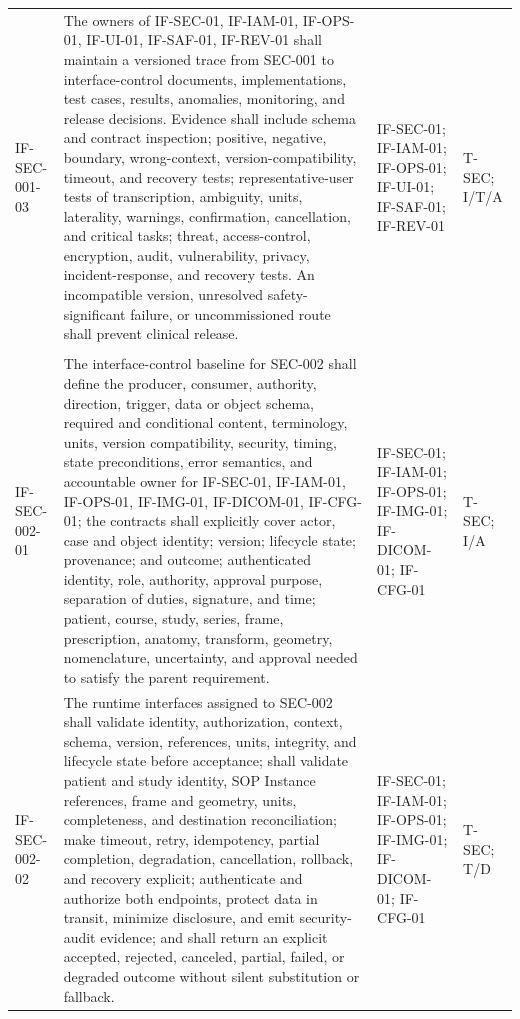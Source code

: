 \documentclass[11pt,letterpaper]{article}
\begin{document}
\begin{scriptsize}
\begin{longtable}{@{}L{0.14\textwidth}L{0.49\textwidth}L{0.19\textwidth}L{0.10\textwidth}@{}}
\addlinespace[2pt]
\mbox{IF-SEC-001-03} & The owners of IF-SEC-01, IF-IAM-01, IF-OPS-01, IF-UI-01, IF-SAF-01, IF-REV-01 shall maintain a versioned trace from SEC-001 to interface-control documents, implementations, test cases, results, anomalies, monitoring, and release decisions. Evidence shall include schema and contract inspection; positive, negative, boundary, wrong-context, version-compatibility, timeout, and recovery tests; representative-user tests of transcription, ambiguity, units, laterality, warnings, confirmation, cancellation, and critical tasks; threat, access-control, encryption, audit, vulnerability, privacy, incident-response, and recovery tests. An incompatible version, unresolved safety-significant failure, or uncommissioned route shall prevent clinical release. & IF-SEC-01; IF-IAM-01; IF-OPS-01; IF-UI-01; IF-SAF-01; IF-REV-01 & T-SEC; I\slash\allowbreak{}T\slash\allowbreak{}A \\
\addlinespace[2pt]
 \\
\addlinespace[2pt]
\mbox{IF-SEC-002-01} & The interface-control baseline for SEC-002 shall define the producer, consumer, authority, direction, trigger, data or object schema, required and conditional content, terminology, units, version compatibility, security, timing, state preconditions, error semantics, and accountable owner for IF-SEC-01, IF-IAM-01, IF-OPS-01, IF-IMG-01, IF-DICOM-01, IF-CFG-01; the contracts shall explicitly cover actor, case and object identity; version; lifecycle state; provenance; and outcome; authenticated identity, role, authority, approval purpose, separation of duties, signature, and time; patient, course, study, series, frame, prescription, anatomy, transform, geometry, nomenclature, uncertainty, and approval needed to satisfy the parent requirement. & IF-SEC-01; IF-IAM-01; IF-OPS-01; IF-IMG-01; IF-DICOM-01; IF-CFG-01 & T-SEC; I\slash\allowbreak{}A \\
\addlinespace[2pt]
\mbox{IF-SEC-002-02} & The runtime interfaces assigned to SEC-002 shall validate identity, authorization, context, schema, version, references, units, integrity, and lifecycle state before acceptance; shall validate patient and study identity, SOP Instance references, frame and geometry, units, completeness, and destination reconciliation; make timeout, retry, idempotency, partial completion, degradation, cancellation, rollback, and recovery explicit; authenticate and authorize both endpoints, protect data in transit, minimize disclosure, and emit security-audit evidence; and shall return an explicit accepted, rejected, canceled, partial, failed, or degraded outcome without silent substitution or fallback. & IF-SEC-01; IF-IAM-01; IF-OPS-01; IF-IMG-01; IF-DICOM-01; IF-CFG-01 & T-SEC; T\slash\allowbreak{}D \\

\end{longtable}
\end{scriptsize}
\end{document}
